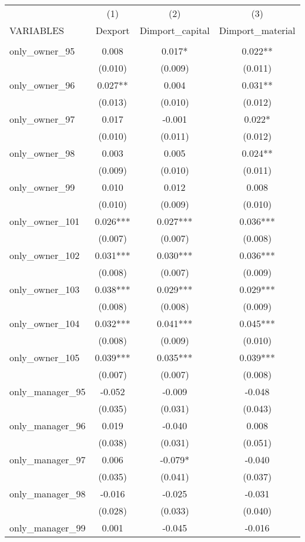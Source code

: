 \begin{tabular}{lccc} \hline
 & (1) & (2) & (3) \\
VARIABLES & Dexport & Dimport\_capital & Dimport\_material \\ \hline
 &  &  &  \\
only\_owner\_95 & 0.008 & 0.017* & 0.022** \\
 & (0.010) & (0.009) & (0.011) \\
only\_owner\_96 & 0.027** & 0.004 & 0.031** \\
 & (0.013) & (0.010) & (0.012) \\
only\_owner\_97 & 0.017 & -0.001 & 0.022* \\
 & (0.010) & (0.011) & (0.012) \\
only\_owner\_98 & 0.003 & 0.005 & 0.024** \\
 & (0.009) & (0.010) & (0.011) \\
only\_owner\_99 & 0.010 & 0.012 & 0.008 \\
 & (0.010) & (0.009) & (0.010) \\
only\_owner\_101 & 0.026*** & 0.027*** & 0.036*** \\
 & (0.007) & (0.007) & (0.008) \\
only\_owner\_102 & 0.031*** & 0.030*** & 0.036*** \\
 & (0.008) & (0.007) & (0.009) \\
only\_owner\_103 & 0.038*** & 0.029*** & 0.029*** \\
 & (0.008) & (0.008) & (0.009) \\
only\_owner\_104 & 0.032*** & 0.041*** & 0.045*** \\
 & (0.008) & (0.009) & (0.010) \\
only\_owner\_105 & 0.039*** & 0.035*** & 0.039*** \\
 & (0.007) & (0.007) & (0.008) \\
only\_manager\_95 & -0.052 & -0.009 & -0.048 \\
 & (0.035) & (0.031) & (0.043) \\
only\_manager\_96 & 0.019 & -0.040 & 0.008 \\
 & (0.038) & (0.031) & (0.051) \\
only\_manager\_97 & 0.006 & -0.079* & -0.040 \\
 & (0.035) & (0.041) & (0.037) \\
only\_manager\_98 & -0.016 & -0.025 & -0.031 \\
 & (0.028) & (0.033) & (0.040) \\
only\_manager\_99 & 0.001 & -0.045 & -0.016 \\

\end{tabular}
